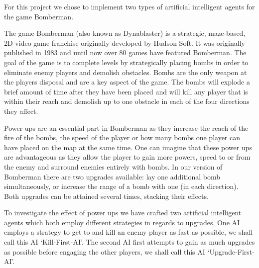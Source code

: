 % 
For this project we chose to implement two types of artificial intelligent agents for the game Bomberman.

The game Bomberman (also known as Dynablaster) is a strategic, maze-based, 2D
video game franchise originally developed by Hudson Soft. It was originally
published in 1983 and until now over 80 games have featured
Bomberman\cite{bomberman2013}.
The goal of the game is to complete levels by strategically placing bombs in order to eliminate enemy players and demolish obstacles. 
Bombs are the only weapon at the players disposal and are a key aspect of the
game. The bombs will explode a brief amount of time after they have been placed
and will kill any player that is within their reach and demolish up to one
obstacle in each of the four directions they affect. 

Power ups are an essential part in Bomberman as they increase the reach of the
fire of the bombs, the speed of the player or how many bombs one player can have
placed on the map at the same time. One can imagine that these power ups are
advantageous as they allow the player to gain more powers, speed to or from the
enemy and surround enemies entirely with bombs. In our version of Bomberman
there are two upgrades available: lay one additional bomb simultaneously, or
increase the range of a bomb with one (in each direction). Both upgrades
can be attained several times, stacking their effects.

To investigate the effect of power ups we have crafted two artificial intelligent agents which both employ different strategies in regards to upgrades. One AI employs a strategy to get to and kill an enemy player as fast as possible, we shall call this AI `Kill-First-AI'. The second AI first attempts to gain as much upgrades as possible before engaging the other players, we shall call this AI `Upgrade-First-AI'.
